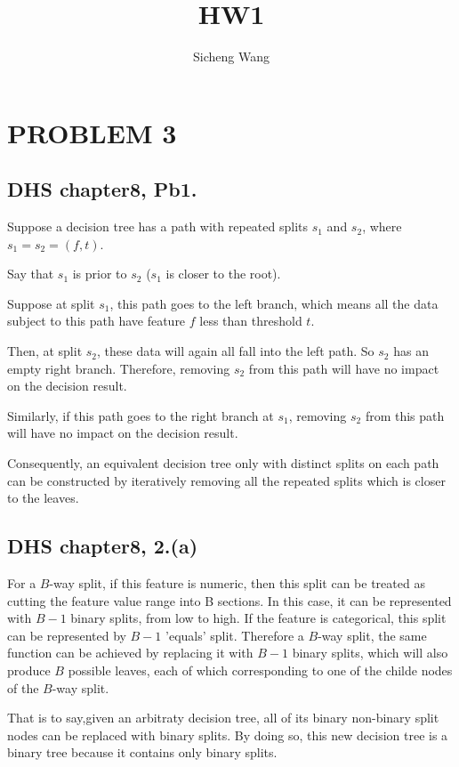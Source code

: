 \documentclass{article}
\title{HW1}
\author{Sicheng Wang}
\begin{document}
	\maketitle
	\section{PROBLEM 3}

	\subsection{DHS chapter8, Pb1.}
		Suppose a decision tree has a path with repeated splits $s_1$ and $s_2$, where $s_1 = s_2 = (f, t)$.\par
		Say that $s_1$ is prior to $s_2$ ($s_1$ is closer to the root).\par
		Suppose at split $s_1$, this path goes to the left branch, which means all the data subject to this path have feature $f$ less than threshold $t$.\par
		Then, at split $s_2$, these data will again all fall into the left path. So $s_2$ has an empty right branch. Therefore, removing $s_2$ from this path will have no impact on the decision result.\par
		Similarly, if this path goes to the right branch at $s_1$, removing $s_2$ from this path will have no impact on the decision result.\par
		Consequently, an equivalent decision tree only with distinct splits on each path can be constructed by iteratively removing all the repeated splits which is closer to the leaves.\par

	\subsection{DHS chapter8, 2.(a)}
		For a $B$-way split, if this feature is numeric, then this split can be treated as cutting the feature value range into B sections. In this case, it can be represented with $B-1$ binary splits, from low to high.
		If the feature is categorical, this split can be represented by $B-1$ 'equals' split.
		Therefore a $B$-way split, the same function can be achieved by replacing it with $B-1$ binary splits, which will also produce $B$ possible leaves, each of which corresponding to one of the childe nodes of the $B$-way split.\par
		That is to say,given an arbitraty decision tree, all of its binary non-binary split nodes can be replaced with binary splits. By doing so, this new decision tree is a binary tree because it contains only binary splits.\par
\end{document}
